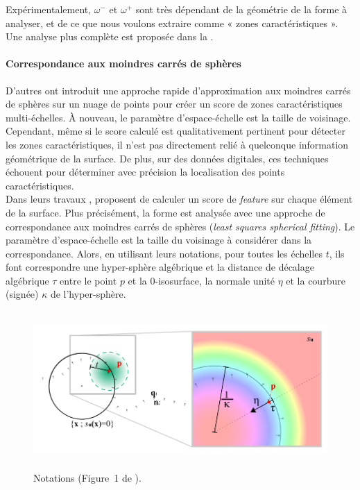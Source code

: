 %
Expérimentalement, $\omega^-$ et $\omega^+$ sont très dépendant de la géométrie
de la forme à analyser, et de ce que nous voulons extraire comme « zones
caractéristiques ». Une analyse plus complète est proposée dans la
.
%
\paragraph{Correspondance aux moindres carrés de sphères}%
\label{sec:applications:feature:growing}
%
D'autres \cite{Mellado2012} ont introduit une approche rapide d'approximation
aux moindres carrés de sphères sur un nuage de points pour créer un score de
zones caractéristiques multi-échelles. À nouveau, le paramètre d'espace-échelle
est la taille de voisinage. Cependant, même si le score calculé est
qualitativement pertinent pour détecter les zones caractéristiques, il n'est pas
directement relié à quelconque information géométrique de la surface. De plus,
sur des données digitales, ces techniques échouent pour déterminer avec
précision la localisation des points caractéristiques.
%
\\
%
Dans leurs travaux \cite{Mellado2012},  proposent de calculer
un score de \emph{feature} sur chaque élément de la surface. Plus précisément,
la forme est analysée avec une approche de correspondance aux moindres carrés de
sphères (\emph{least squares spherical fitting}). Le paramètre d'espace-échelle
est la taille du voisinage à considérer dans la correspondance. Alors, en
utilisant leurs notations, pour toutes les échelles $t$, ils font correspondre
une hyper-sphère algébrique et la distance de décalage algébrique $\tau$ entre
le point $p$ et la $0$-isosurface, la normale unité $\eta$ et la courbure
(signée) $\kappa$ de l'hyper-sphère.
%
\begin{figure}[ht]{
    \begin{center}
    \includegraphics[height=6cm]{images/Feature/Mellado_notations}
    \end{center}}
    \caption[Notations.]{Notations (Figure~1 de \cite{Mellado2012}).
      \label{fig:mellado-notations}}
\end{figure}
